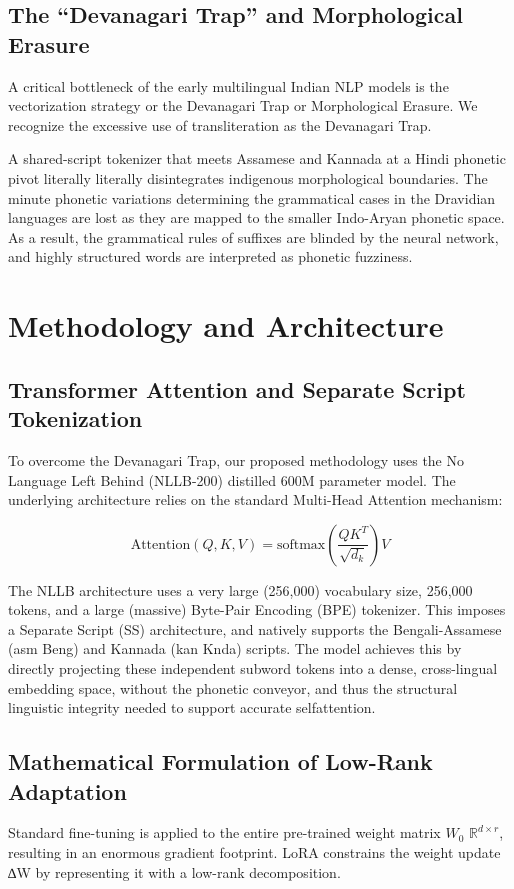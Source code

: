\documentclass[conference]{IEEEtran}
\begin{document}
\subsection{The ``Devanagari Trap'' and Morphological Erasure}
A critical bottleneck of the early multilingual Indian NLP models is the vectorization strategy or the Devanagari Trap or Morphological Erasure. We recognize the excessive use of transliteration as the Devanagari Trap.

A shared-script tokenizer that meets Assamese and Kannada at a Hindi phonetic pivot literally literally disintegrates indigenous morphological boundaries. The minute phonetic variations determining the grammatical cases in the Dravidian languages are lost as they are mapped to the smaller Indo-Aryan phonetic space. As a result, the grammatical rules of suffixes are blinded by the neural network, and highly structured words are interpreted as phonetic fuzziness.
\section{Methodology and Architecture}

\subsection{Transformer Attention and Separate Script Tokenization}
To overcome the Devanagari Trap, our proposed methodology uses the No Language Left Behind (NLLB-200) distilled 600M parameter model. The underlying architecture relies on the standard Multi-Head Attention mechanism:

\begin{equation}
\text{Attention}(Q, K, V) = \text{softmax}\left(\frac{QK^T}{\sqrt{d_k}}\right)V
\end{equation}

The NLLB architecture uses a very large (256,000) vocabulary size, 256,000 tokens, and a large (massive) Byte-Pair Encoding (BPE) tokenizer. This imposes a Separate Script (SS) architecture, and natively supports the Bengali-Assamese (asm Beng) and Kannada (kan Knda) scripts. The model achieves this by directly projecting these independent subword tokens into a dense, cross-lingual embedding space, without the phonetic conveyor, and thus the structural linguistic integrity needed to support accurate selfattention.

\subsection{Mathematical Formulation of Low-Rank Adaptation}
Standard fine-tuning is applied to the entire pre-trained weight matrix $W_0$ \in $\mathbb{R}^{d \times r}$, resulting in an enormous gradient footprint. LoRA constrains the weight update ∆W by representing it with a low-rank decomposition.
\end{document}
